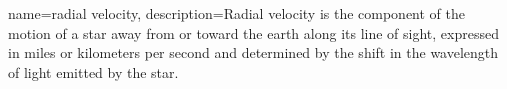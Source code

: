 {
    name=radial velocity,
    description={Radial velocity is the component of the motion of a star away from or toward the earth along its line of sight, expressed in miles or kilometers per second and determined by the shift in the wavelength of light emitted by the star.}
}

